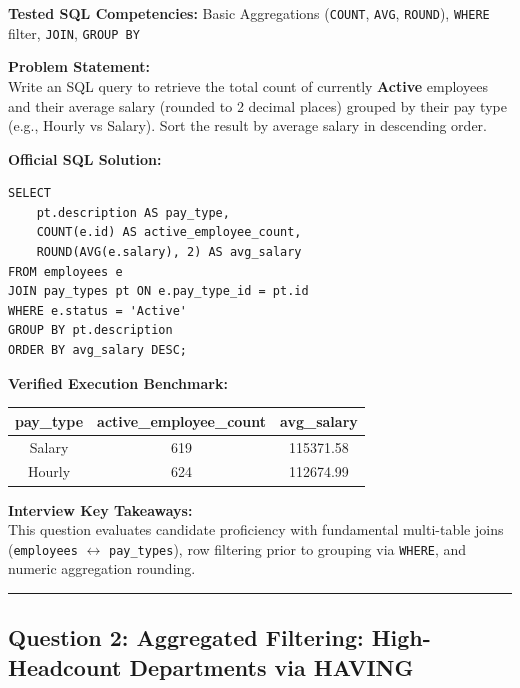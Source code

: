 \documentclass[11pt,a4paper]{article}
\begin{document}
\noindent\textbf{Tested SQL Competencies:} Basic Aggregations (\texttt{COUNT}, \texttt{AVG}, \texttt{ROUND}), \texttt{WHERE} filter, \texttt{JOIN}, \texttt{GROUP BY}

\vspace{0.15cm}
\noindent\textbf{Problem Statement:} \\
Write an SQL query to retrieve the total count of currently \textbf{Active} employees and their average salary (rounded to 2 decimal places) grouped by their pay type (e.g., Hourly vs Salary). Sort the result by average salary in descending order.

\vspace{0.25cm}
\noindent\textbf{Official SQL Solution:}
\begin{verbatim}
SELECT 
    pt.description AS pay_type,
    COUNT(e.id) AS active_employee_count,
    ROUND(AVG(e.salary), 2) AS avg_salary
FROM employees e
JOIN pay_types pt ON e.pay_type_id = pt.id
WHERE e.status = 'Active'
GROUP BY pt.description
ORDER BY avg_salary DESC;
\end{verbatim}

\vspace{0.15cm}
\noindent\textbf{Verified Execution Benchmark:}
\begin{center}
\small
\begin{tabular}{ccc}
\toprule
\textbf{pay\_type} & \textbf{active\_employee\_count} & \textbf{avg\_salary} \\
\midrule
Salary & 619 & 115371.58 \\
Hourly & 624 & 112674.99 \\
\bottomrule
\end{tabular}
\end{center}

\vspace{0.15cm}
\noindent\textbf{Interview Key Takeaways:} \\
This question evaluates candidate proficiency with fundamental multi-table joins (\texttt{employees} $\leftrightarrow$ \texttt{pay\_types}), row filtering prior to grouping via \texttt{WHERE}, and numeric aggregation rounding.

\vspace{0.4cm}
\noindent\rule{\textwidth}{0.4pt}
\vspace{0.4cm}

\subsection*{Question 2: Aggregated Filtering: High-Headcount Departments via HAVING}
\end{document}
